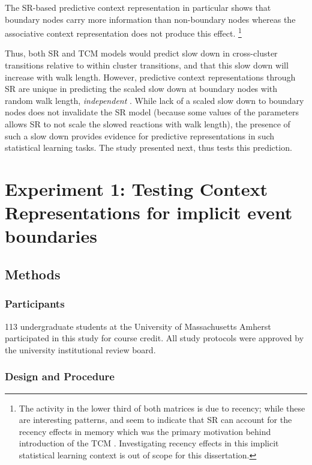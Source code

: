 The SR-based predictive context representation in particular shows that boundary nodes carry more information than non-boundary nodes whereas the associative context representation does not produce this effect. \footnote{The activity in the lower third of both matrices is due to recency; while these are interesting patterns, and seem to indicate that SR can account for the recency effects in memory which was the primary motivation behind introduction of the TCM \cite{gershman2012successor,howard2005temporal}. Investigating recency effects in this implicit statistical learning context is out of scope for this dissertation.}

Thus, both SR and TCM models would predict slow down in cross-cluster transitions relative to within cluster transitions, and that this slow down will increase with walk length. However, predictive context representations through SR are unique in predicting the scaled slow down at boundary nodes with random walk length, \textit{independent} . While lack of a scaled slow down to boundary nodes does not invalidate the SR model (because some values of the parameters allows SR to not scale the slowed reactions with walk length), the presence of such a slow down provides evidence for predictive representations in such statistical learning tasks. The study presented next, thus tests this prediction. 

\section{Experiment 1: Testing Context Representations for implicit event boundaries}
\subsection{Methods}

\subsubsection*{Participants}
113 undergraduate students at the University of Massachusetts Amherst participated in this study for course credit. All study protocols were approved by the university institutional review board. 

\subsubsection*{Design and Procedure}

